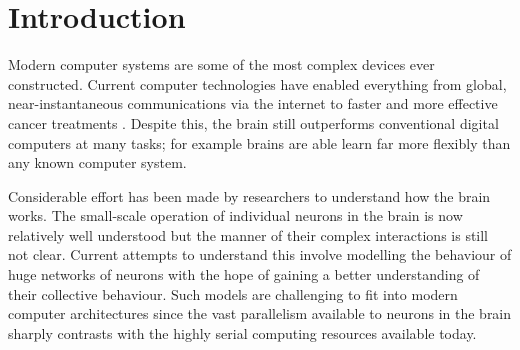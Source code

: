 \chapter{Introduction}
	
	
	Modern computer systems are some of the most complex devices ever constructed.
	Current computer technologies have enabled everything from global,
	near-instantaneous communications via the internet to faster and more
	effective cancer treatments \cite{nassif}. Despite this, the brain still
	outperforms conventional digital computers at many tasks; for example brains
	are able learn far more flexibly than any known computer system.
	
	Considerable effort has been made by researchers to understand how the brain
	works. The small-scale operation of individual neurons in the brain is now
	relatively well understood but the manner of their complex interactions is
	still not clear. Current attempts to understand this involve modelling the
	behaviour of huge networks of neurons with the hope of gaining a better
	understanding of their collective behaviour. Such models are challenging to
	fit into modern computer architectures since the vast parallelism available to
	neurons in the brain sharply contrasts with the highly serial computing
	resources available today.

